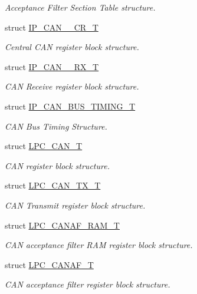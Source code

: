 \begin{DoxyCompactItemize}
\begin{DoxyCompactList}\small\item\em Acceptance Filter Section Table structure. \end{DoxyCompactList}\item 
struct \hyperlink{structIP__CAN__001__CR__T}{I\+P\+\_\+\+C\+A\+N\+\_\+\_\+\+C\+R\+\_\+T}
\begin{DoxyCompactList}\small\item\em Central C\+AN register block structure. \end{DoxyCompactList}\item 
struct \hyperlink{structIP__CAN__001__RX__T}{I\+P\+\_\+\+C\+A\+N\+\_\+\_\+\+R\+X\+\_\+T}
\begin{DoxyCompactList}\small\item\em C\+AN Receive register block structure. \end{DoxyCompactList}\item 
struct \hyperlink{structIP__CAN__BUS__TIMING__T}{I\+P\+\_\+\+C\+A\+N\+\_\+\+B\+U\+S\+\_\+\+T\+I\+M\+I\+N\+G\+\_\+T}
\begin{DoxyCompactList}\small\item\em C\+AN Bus Timing Structure. \end{DoxyCompactList}\item 
struct \hyperlink{structLPC__CAN__T}{L\+P\+C\+\_\+\+C\+A\+N\+\_\+T}
\begin{DoxyCompactList}\small\item\em C\+AN register block structure. \end{DoxyCompactList}\item 
struct \hyperlink{structLPC__CAN__TX__T}{L\+P\+C\+\_\+\+C\+A\+N\+\_\+\+T\+X\+\_\+T}
\begin{DoxyCompactList}\small\item\em C\+AN Transmit register block structure. \end{DoxyCompactList}\item 
struct \hyperlink{structLPC__CANAF__RAM__T}{L\+P\+C\+\_\+\+C\+A\+N\+A\+F\+\_\+\+R\+A\+M\+\_\+T}
\begin{DoxyCompactList}\small\item\em C\+AN acceptance filter R\+AM register block structure. \end{DoxyCompactList}\item 
struct \hyperlink{structLPC__CANAF__T}{L\+P\+C\+\_\+\+C\+A\+N\+A\+F\+\_\+T}
\begin{DoxyCompactList}\small\item\em C\+AN acceptance filter register block structure. \end{DoxyCompactList}\end{DoxyCompactItemize}
